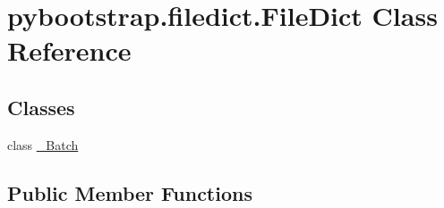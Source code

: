 \hypertarget{classpybootstrap_1_1filedict_1_1FileDict}{\section{pybootstrap.\-filedict.\-File\-Dict Class Reference}
\label{classpybootstrap_1_1filedict_1_1FileDict}
}
\subsection*{Classes}
\begin{DoxyCompactItemize}
\item 
class \hyperlink{classpybootstrap_1_1filedict_1_1FileDict_1_1__Batch}{\-\_\-\-Batch}
\end{DoxyCompactItemize}
\subsection*{Public Member Functions}
